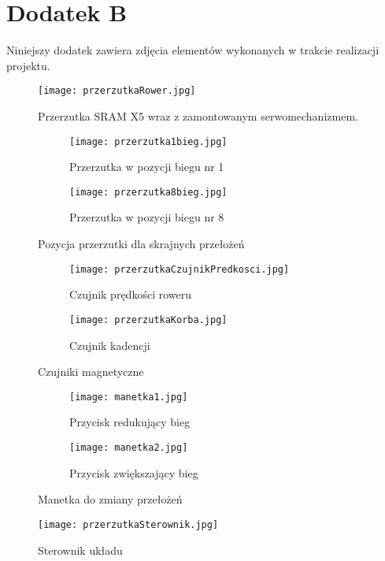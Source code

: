 \chapter{Dodatek B}

Niniejszy dodatek zawiera zdjęcia elementów wykonanych w trakcie realizacji projektu.

\begin{figure}[h]
    \centering
    \texttt{[image: przerzutkaRower.jpg]}
    \caption{Przerzutka SRAM X5 wraz z zamontowanym serwomechanizmem.}
    \label{fig:Rower}
\end{figure}


\begin{figure}[h]
\centering
\begin{subfigure}{.4\textwidth}
  \centering
  \texttt{[image: przerzutka1bieg.jpg]}
  \caption{Przerzutka w pozycji biegu nr 1}

\end{subfigure}
\begin{subfigure}{.4\textwidth}
  \centering
  \texttt{[image: przerzutka8bieg.jpg]}
  \caption{Przerzutka w pozycji biegu nr 8}

\end{subfigure}
\caption{Pozycja przerzutki dla skrajnych przełożeń}
\label{fig:test}
\end{figure}

\begin{figure}[h]
\centering
\begin{subfigure}{.4\textwidth}
  \centering
  \texttt{[image: przerzutkaCzujnikPredkosci.jpg]}
  \caption{Czujnik prędkości roweru}
\end{subfigure}
\begin{subfigure}{.4\textwidth}
  \centering
  \texttt{[image: przerzutkaKorba.jpg]}
  \caption{Czujnik kadencji}

\end{subfigure}
\caption{Czujniki magnetyczne}
\label{fig:test}
\end{figure}

\begin{figure}[h]
\centering
\begin{subfigure}{.4\textwidth}
  \centering
  \texttt{[image: manetka1.jpg]}
  \caption{Przycisk redukujący bieg}
\end{subfigure}
\begin{subfigure}{.4\textwidth}
  \centering
  \texttt{[image: manetka2.jpg]}
  \caption{Przycisk zwiększający bieg}
\end{subfigure}
\caption{Manetka do zmiany przełożeń}
\label{fig:test}
\end{figure}

\begin{figure}[h]
    \centering
    \texttt{[image: przerzutkaSterownik.jpg]}
    \caption{Sterownik układu}
    \label{fig:sterownik}
\end{figure}